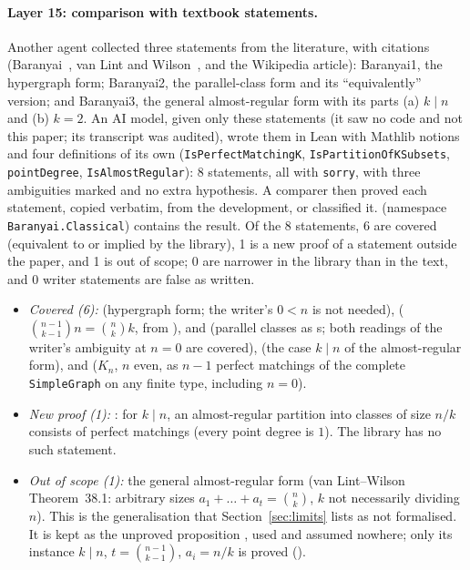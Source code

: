 \documentclass[11pt]{article}
\theoremstyle{definition}
\theoremstyle{remark}
\newcommand{\lean}[1]{\texttt{#1}}
\begin{document}
\paragraph{Layer 15: comparison with textbook statements.} Another agent collected three statements
from the literature, with citations (Baranyai~\cite{Baranyai1975}, van Lint and
Wilson~\cite[Thm.~38.1]{vLW}, and the Wikipedia article): Baranyai1, the hypergraph form; Baranyai2,
the parallel-class form and its ``equivalently'' version; and Baranyai3, the general almost-regular
form with its parts (a) $k\mid n$ and (b) $k=2$. An AI model, given only these statements (it saw no
code and not this paper; its transcript was audited), wrote them in Lean with Mathlib notions and
four definitions of its own (\lean{IsPerfectMatchingK}, \lean{IsPartitionOfKSubsets},
\lean{pointDegree}, \lean{IsAlmostRegular}): 8 statements, all with \lean{sorry}, with three
ambiguities marked and no extra hypothesis. A comparer then proved each statement, copied verbatim,
from the development, or classified it.  (namespace
\lean{Baranyai.Classical}) contains the result. Of the 8 statements, 6 are covered (equivalent to or
implied by the library), 1 is a new proof of a statement outside the paper, and 1 is out of scope;
0 are narrower in the library than in the text, and 0 writer statements are false as written.
\begin{itemize}
\item \emph{Covered (6):}  (hypergraph form; the writer's
$0<n$ is not needed),  ($\binom{n-1}{k-1}n=\binom nk k$, from
),  and
 (parallel classes as s; both readings
of the writer's ambiguity at $n=0$ are covered), 
(the case $k\mid n$ of the almost-regular form), and 
($K_n$, $n$ even, as $n-1$ perfect matchings of the complete \lean{SimpleGraph} on any finite type,
including $n=0$).
\item \emph{New proof (1):} : for $k\mid n$, an
almost-regular partition into classes of size $n/k$ consists of perfect matchings (every point
degree is $1$). The library has no such statement.
\item \emph{Out of scope (1):} the general almost-regular form (van Lint--Wilson Theorem~38.1:
arbitrary sizes $a_1+\dots+a_t=\binom nk$, $k$ not necessarily dividing $n$). This is the
generalisation that Section~\ref{sec:limits} lists as not formalised. It is kept as the unproved
proposition , used and assumed nowhere; only its
instance $k\mid n$, $t=\binom{n-1}{k-1}$, $a_i=n/k$ is proved
().
\end{itemize}
\end{document}
